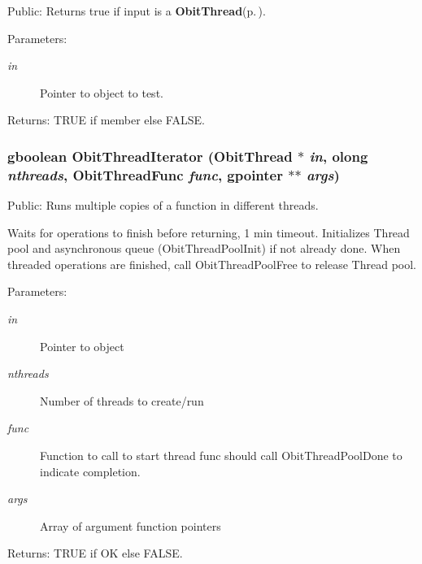 Public: Returns true if input is a {\bf Obit\-Thread}{\rm (p.\,\pageref{structObitThread})}. 

\begin{Desc}
\item[Parameters:]
\begin{description}
\item[{\em in}]Pointer to object to test. \end{description}
\end{Desc}
\begin{Desc}
\item[Returns:]TRUE if member else FALSE. \end{Desc}
\subsubsection{\setlength{\rightskip}{0pt plus 5cm}gboolean Obit\-Thread\-Iterator ({\bf Obit\-Thread} $\ast$ {\em in}, {\bf olong} {\em nthreads}, {\bf Obit\-Thread\-Func} {\em func}, gpointer $\ast$$\ast$ {\em args})}\label{ObitThread_8c_a23}


Public: Runs multiple copies of a function in different threads. 

Waits for operations to finish before returning, 1 min timeout. Initializes Thread pool and asynchronous queue (Obit\-Thread\-Pool\-Init) if not already done. When threaded operations are finished, call Obit\-Thread\-Pool\-Free to release Thread pool. \begin{Desc}
\item[Parameters:]
\begin{description}
\item[{\em in}]Pointer to object \item[{\em nthreads}]Number of threads to create/run \item[{\em func}]Function to call to start thread func should call Obit\-Thread\-Pool\-Done to indicate completion. \item[{\em args}]Array of argument function pointers \end{description}
\end{Desc}
\begin{Desc}
\item[Returns:]TRUE if OK else FALSE. \end{Desc}
